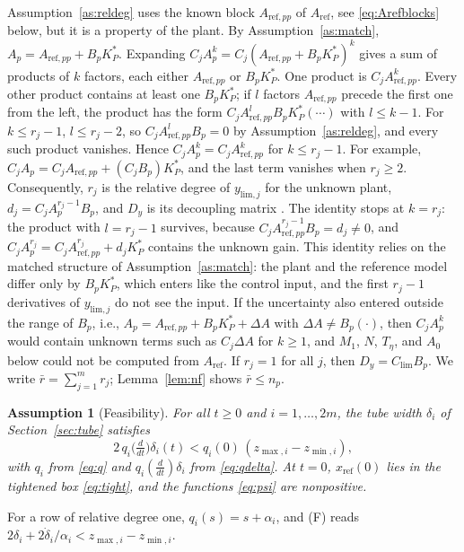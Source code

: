 \documentclass[lettersize,journal]{IEEEtran}
\newtheorem{assumption}{Assumption}
\newcommand{\xr}{x_{\mathrm{ref}}}
\newcommand{\Ar}{A_{\mathrm{ref}}}
\newcommand{\App}{A_{\mathrm{ref},pp}}
\newcommand{\Clim}{C_{\mathrm{lim}}}
\begin{document}
Assumption~\ref{as:reldeg} uses the known block $\App$ of $\Ar$, see \eqref{eq:Arefblocks} below, but it is a property of the plant. By Assumption~\ref{as:match}, $A_p=\App+B_pK_P^*$. Expanding $C_jA_p^k=C_j(\App+B_pK_P^*)^k$ gives a sum of products of $k$ factors, each either $\App$ or $B_pK_P^*$. One product is $C_j\App^k$. Every other product contains at least one $B_pK_P^*$; if $l$ factors $\App$ precede the first one from the left, the product has the form $C_j\App^lB_pK_P^*(\cdots)$ with $l\le k-1$. For $k\le r_j-1$, $l\le r_j-2$, so $C_j\App^lB_p=0$ by Assumption~\ref{as:reldeg}, and every such product vanishes. Hence $C_jA_p^k=C_j\App^k$ for $k\le r_j-1$. For example, $C_jA_p=C_j\App+(C_jB_p)K_P^*$, and the last term vanishes when $r_j\ge2$. Consequently, $r_j$ is the relative degree of $y_{\mathrm{lim},j}$ for the unknown plant, $d_j=C_jA_p^{r_j-1}B_p$, and $D_y$ is its decoupling matrix \cite[Sec.~5.1]{isidori1995}. The identity stops at $k=r_j$: the product with $l=r_j-1$ survives, because $C_j\App^{r_j-1}B_p=d_j\ne0$, and $C_jA_p^{r_j}=C_j\App^{r_j}+d_jK_P^*$ contains the unknown gain. This identity relies on the matched structure of Assumption~\ref{as:match}: the plant and the reference model differ only by $B_pK_P^*$, which enters like the control input, and the first $r_j-1$ derivatives of $y_{\mathrm{lim},j}$ do not see the input. If the uncertainty also entered outside the range of $B_p$, i.e., $A_p=\App+B_pK_P^*+\Delta A$ with $\Delta A\ne B_p(\cdot)$, then $C_jA_p^k$ would contain unknown terms such as $C_j\Delta A$ for $k\ge1$, and $M_1$, $N$, $T_\eta$, and $A_0$ below could not be computed from $\Ar$. If $r_j=1$ for all $j$, then $D_y=\Clim B_p$. We write $\bar r=\sum_{j=1}^mr_j$; Lemma~\ref{lem:nf} shows $\bar r\le n_p$.

\begin{assumption}[Feasibility] \label{as:feas}
For all $t\ge0$ and $i=1,\dots,2m$, the tube width $\delta_i$ of Section~\ref{sec:tube} satisfies
\begin{equation}
2\,q_i\big(\tfrac{d}{dt}\big)\delta_i(t) < q_i(0)\,(z_{\max,i}-z_{\min,i}), \tag{F}
\end{equation}
with $q_i$ from \eqref{eq:q} and $q_i(\frac{d}{dt})\delta_i$ from \eqref{eq:qdelta}. At $t=0$, $\xr(0)$ lies in the tightened box \eqref{eq:tight}, and the functions \eqref{eq:psi} are nonpositive.
\end{assumption}

For a row of relative degree one, $q_i(s)=s+\alpha_i$, and (F) reads $2\delta_i+2\dot\delta_i/\alpha_i<z_{\max,i}-z_{\min,i}$.
\end{document}
